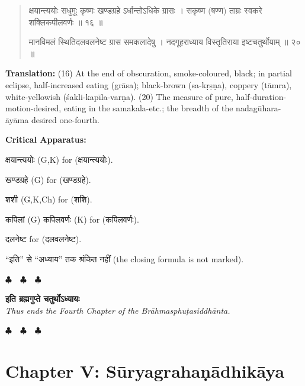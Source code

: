 \documentclass[11pt,a4paper]{article}
\newcommand{\dev}[1]{{\devanagarifont #1}}
\newenvironment{sanskritverse}{%
  \begin{quote}%
  \devanagarifont%
  \setlength{\leftmargin}{2em}%
}{\end{quote}}
\newenvironment{variants}{%
  \small%
  \color{varecolor}%
  \list{}{\leftmargin=2em\itemindent=-1em}%
}{\endlist}
\newcommand{\chapterend}{%
  \begin{center}%
  \textcolor{endmarkcolor}{$\clubsuit$~~$\clubsuit$~~$\clubsuit$}%
  \end{center}%
}
\begin{document}
\begin{sanskritverse}
\dev{क्षयान्त्ययोः सधुमूः कृष्णः खण्डग्रहे ऽर्धान्तोऽधिके ग्रासः} ।
\dev{सकृष्ण (षण्ण) ताम्रः स्वकरे शक्लिकपीलवर्णः ॥ १६ ॥}

\dev{मानविमलं स्थितिदलवलनेष्ट ग्रास समकलादेषु} ।
\dev{नदगूहराध्याय विस्तृतिराया इष्टचतुर्थोयाम् ॥ २० ॥}
\end{sanskritverse}

\textbf{Translation:} (16) At the end of obscuration, smoke-coloured, black; in partial 
eclipse, half-increased eating (grāsa); black-brown (sa-kṛṣṇa), coppery (tāmra), 
white-yellowish (śakli-kapīla-varṇa). (20) The measure of pure, half-duration-motion-desired, 
eating in the samakala-etc.; the breadth of the nadagūhara-āyāma desired one-fourth.

\textcolor{varecolor}{\textbf{Critical Apparatus:}}
\begin{variants}
\item[16.1] \dev{क्षयान्त्ययोः} (G,K) \dev{for} (\dev{क्षयान्त्ययोः}).
\item[16.2] \dev{खण्डग्रहे} (G) \dev{for} (\dev{खण्डग्रहे}).
\item[16.3] \dev{शशी} (G,K,Ch) \dev{for} (\dev{शशि}).
\item[16.4] \dev{कपिलां} (G) \dev{कपिलवर्णः} (K) \dev{for} (\dev{कपिलवर्णः}).
\item[20.1] \dev{दलनेष्ट} \dev{for} (\dev{दलवलनेष्ट}).
\item[\dev{वि०}] \dev{``इति'' से ``अध्याय'' तक श्रंकित नहीं} (the closing formula is not marked).
\end{variants}

\vspace{0.5cm}
\chapterend
\begin{center}
\dev{\textbf{इति ब्रह्मगुप्ते चतुर्थोऽध्यायः}}\\[0.2cm]
\textit{Thus ends the Fourth Chapter of the Brāhmasphuṭasiddhānta.}
\end{center}
\chapterend

\newpage

\section*{Chapter V: Sūryagrahaṇādhikāya}
\end{document}
